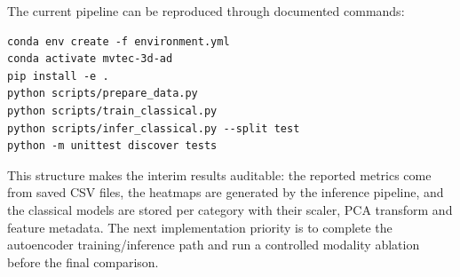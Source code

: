 The current pipeline can be reproduced through documented commands:
\begin{lstlisting}[basicstyle=\ttfamily\scriptsize,frame=single]
conda env create -f environment.yml
conda activate mvtec-3d-ad
pip install -e .
python scripts/prepare_data.py
python scripts/train_classical.py
python scripts/infer_classical.py --split test
python -m unittest discover tests
\end{lstlisting}

This structure makes the interim results auditable: the reported metrics come from saved CSV files, the heatmaps are generated by the inference pipeline, and the classical models are stored per category with their scaler, PCA transform and feature metadata. The next implementation priority is to complete the autoencoder training/inference path and run a controlled modality ablation before the final comparison.
